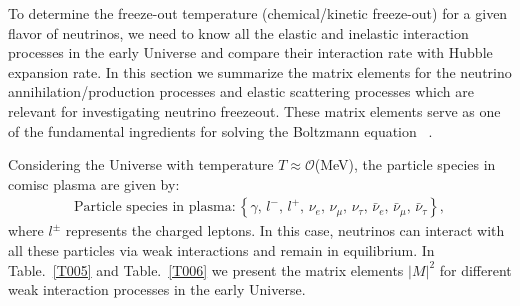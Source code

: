 To determine the freeze-out temperature (chemical/kinetic freeze-out) for a given flavor of neutrinos, we need to know all the elastic and inelastic interaction processes in the early Universe and compare their interaction rate with Hubble expansion rate. In this section we summarize the matrix elements for the neutrino annihilation/production processes and elastic scattering processes which are relevant for investigating neutrino freezeout. These matrix elements serve as one of the fundamental ingredients for solving the Boltzmann equation ~\cite{Birrell:2014uka}.

Considering the Universe with temperature $T\approx\mathcal{O}$(MeV), the   particle species in comisc plasma are given by:
\begin{align}
\mathrm{Particle\,\,species\,\, in \,\,plasma:}
\left\{\gamma,\, l^-,\,l^+,\, \nu_e,\, \nu_\mu,\, \nu_\tau,\, \bar{\nu}_e,\, \bar{\nu}_\mu,\, \bar{\nu}_\tau\right\},
\end{align}
 where $l^\pm$ represents the charged leptons. In this case, neutrinos can interact with all these particles via weak interactions and remain in equilibrium. In Table.~\ref{T005} and Table.~\ref{T006} we present the matrix elements $|M|^2$ for different weak interaction processes in the early Universe.

